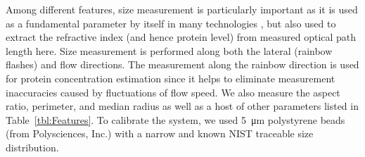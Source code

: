 \documentclass[aps,pra,reprint,superscriptaddress]{revtex4-1}
\begin{document}
Among different features, size measurement is particularly important as it is used as a fundamental parameter by itself in many technologies \cite{adams2008highly, nagrath2007isolation, vona2000isolation, gossett2010label}, but also used to extract the refractive index (and hence protein level) from measured optical path length here. Size measurement is performed along both the lateral (rainbow flashes) and flow directions. The measurement along the rainbow direction is used for protein concentration estimation since it helps to eliminate measurement inaccuracies caused by fluctuations of flow speed. We also measure the aspect ratio, perimeter, and median radius as well as a host of other parameters listed in Table~\ref{tbl:Features}. To calibrate the system, we used \SI{5}{\micro\meter} polystyrene beads (from Polysciences, Inc.) with a narrow and known NIST traceable size distribution.
\end{document}
